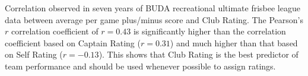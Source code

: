 Correlation observed in seven years of BUDA recreational ultimate frisbee league data between average per game plus/minus score and Club Rating. The Pearson's $r$ correlation coefficient of $r = 0.43$ is significantly higher than the correlation coefficient based on Captain Rating ($r = 0.31$) and much higher than that based on Self Rating ($r = -0.13$). This shows that Club Rating is the best predictor of team performance and should be used whenever possible to assign ratings.